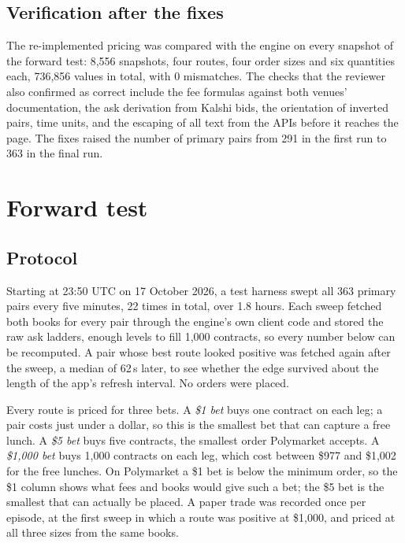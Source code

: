 \documentclass[5p,letterpaper]{elsarticle}
\begin{document}
\subsection{Verification after the fixes}

The re-implemented pricing was compared with the engine on every snapshot of the forward test: 8,556 snapshots, four routes, four order sizes and six quantities each, 736,856 values in total, with 0 mismatches. The checks that the reviewer also confirmed as correct include the fee formulas against both venues' documentation, the ask derivation from Kalshi bids, the orientation of inverted pairs, time units, and the escaping of all text from the APIs before it reaches the page. The fixes raised the number of primary pairs from 291 in the first run to 363 in the final run.

\section{Forward test}\label{sec:forward}

\subsection{Protocol}

Starting at 23:50 UTC on 17 October 2026, a test harness swept all 363 primary pairs every five minutes, 22 times in total, over 1.8 hours. Each sweep fetched both books for every pair through the engine's own client code and stored the raw ask ladders, enough levels to fill 1,000 contracts, so every number below can be recomputed. A pair whose best route looked positive was fetched again after the sweep, a median of 62\,s later, to see whether the edge survived about the length of the app's refresh interval. No orders were placed.

Every route is priced for three bets. A \emph{\$1 bet} buys one contract on each leg; a pair costs just under a dollar, so this is the smallest bet that can capture a free lunch. A \emph{\$5 bet} buys five contracts, the smallest order Polymarket accepts. A \emph{\$1,000 bet} buys 1,000 contracts on each leg, which cost between \$977 and \$1,002 for the free lunches. On Polymarket a \$1 bet is below the minimum order, so the \$1 column shows what fees and books would give such a bet; the \$5 bet is the smallest that can actually be placed. A paper trade was recorded once per episode, at the first sweep in which a route was positive at \$1,000, and priced at all three sizes from the same books.
\end{document}
